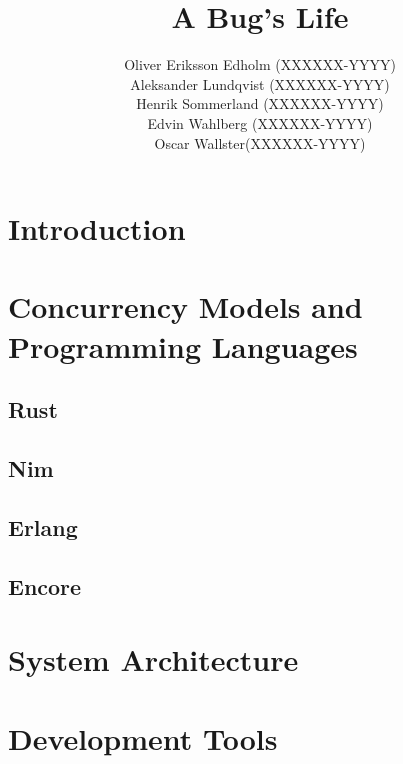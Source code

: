 \documentclass[a4paper]{article}
\title{A Bug's Life}
\author{Oliver Eriksson Edholm (XXXXXX-YYYY) \\
		Aleksander Lundqvist (XXXXXX-YYYY) \\
		Henrik Sommerland (XXXXXX-YYYY) \\
		Edvin Wahlberg (XXXXXX-YYYY) \\
		Oscar Wallster(XXXXXX-YYYY)}
\begin{document}
\maketitle

\section{Introduction}

\section{Concurrency Models and Programming Languages}

\subsection{Rust}

\subsection{Nim}

\subsection{Erlang}

\subsection{Encore}

\section{System Architecture}

\section{Development Tools}
\end{document}
